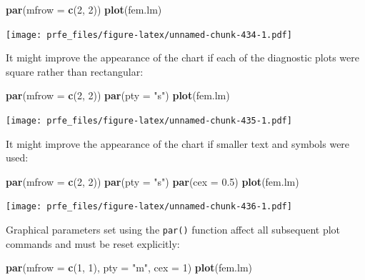 \documentclass[12pt,a4paper]{book}
\newenvironment{Shaded}{\begin{snugshade}}{\end{snugshade}}
\newcommand{\KeywordTok}[1]{\textcolor[rgb]{0.13,0.29,0.53}{\textbf{#1}}}
\newcommand{\DataTypeTok}[1]{\textcolor[rgb]{0.13,0.29,0.53}{#1}}
\newcommand{\DecValTok}[1]{\textcolor[rgb]{0.00,0.00,0.81}{#1}}
\newcommand{\FloatTok}[1]{\textcolor[rgb]{0.00,0.00,0.81}{#1}}
\newcommand{\StringTok}[1]{\textcolor[rgb]{0.31,0.60,0.02}{#1}}
\newcommand{\NormalTok}[1]{#1}
\theoremstyle{definition}
\theoremstyle{definition}
\theoremstyle{definition}
\theoremstyle{remark}
\begin{document}
\begin{Shaded}
\begin{Highlighting}[]
\KeywordTok{par}\NormalTok{(}\DataTypeTok{mfrow =} \KeywordTok{c}\NormalTok{(}\DecValTok{2}\NormalTok{, }\DecValTok{2}\NormalTok{))}
\KeywordTok{plot}\NormalTok{(fem.lm)}
\end{Highlighting}
\end{Shaded}

\texttt{[image: prfe\_files/figure-latex/unnamed-chunk-434-1.pdf]}

It might improve the appearance of the chart if each of the diagnostic
plots were square rather than rectangular:

\begin{Shaded}
\begin{Highlighting}[]
\KeywordTok{par}\NormalTok{(}\DataTypeTok{mfrow =} \KeywordTok{c}\NormalTok{(}\DecValTok{2}\NormalTok{, }\DecValTok{2}\NormalTok{))}
\KeywordTok{par}\NormalTok{(}\DataTypeTok{pty =} \StringTok{"s"}\NormalTok{)}
\KeywordTok{plot}\NormalTok{(fem.lm)}
\end{Highlighting}
\end{Shaded}

\texttt{[image: prfe\_files/figure-latex/unnamed-chunk-435-1.pdf]}

It might improve the appearance of the chart if smaller text and symbols
were used:

\begin{Shaded}
\begin{Highlighting}[]
\KeywordTok{par}\NormalTok{(}\DataTypeTok{mfrow =} \KeywordTok{c}\NormalTok{(}\DecValTok{2}\NormalTok{, }\DecValTok{2}\NormalTok{))}
\KeywordTok{par}\NormalTok{(}\DataTypeTok{pty =} \StringTok{"s"}\NormalTok{)}
\KeywordTok{par}\NormalTok{(}\DataTypeTok{cex =} \FloatTok{0.5}\NormalTok{)}
\KeywordTok{plot}\NormalTok{(fem.lm)}
\end{Highlighting}
\end{Shaded}

\texttt{[image: prfe\_files/figure-latex/unnamed-chunk-436-1.pdf]}

Graphical parameters set using the \texttt{par()} function affect all
subsequent plot commands and must be reset explicitly:

\begin{Shaded}
\begin{Highlighting}[]
\KeywordTok{par}\NormalTok{(}\DataTypeTok{mfrow =} \KeywordTok{c}\NormalTok{(}\DecValTok{1}\NormalTok{, }\DecValTok{1}\NormalTok{), }\DataTypeTok{pty =} \StringTok{"m"}\NormalTok{, }\DataTypeTok{cex =} \DecValTok{1}\NormalTok{)}
\KeywordTok{plot}\NormalTok{(fem.lm)}
\end{Highlighting}
\end{Shaded}
\end{document}
